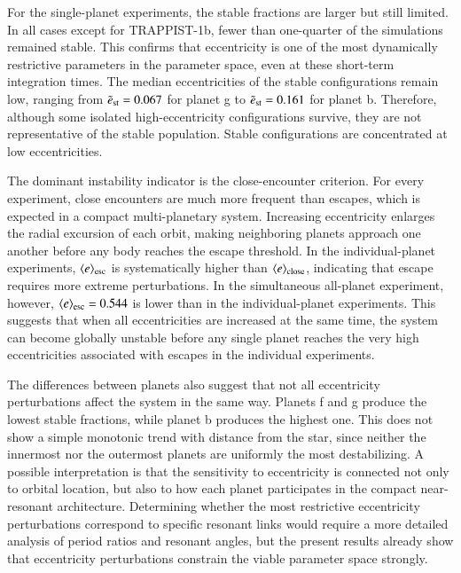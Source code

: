 \documentclass{aa}
\begin{document}
For the single-planet experiments, the stable fractions are larger but still limited. In all cases except for TRAPPIST-1b, fewer than one-quarter of the simulations remained stable. This confirms that eccentricity is one of the most dynamically restrictive parameters in the parameter space, even at these short-term integration times. The median eccentricities of the stable configurations remain low, ranging from $\tilde{e}_{\rm st}=0.067$ for planet g to $\tilde{e}_{\rm st}=0.161$ for planet b. Therefore, although some isolated high-eccentricity configurations survive, they are not representative of the stable population. Stable configurations are concentrated at low eccentricities.

The dominant instability indicator is the close-encounter criterion. For every experiment, close encounters are much more frequent than escapes, which is expected in a compact multi-planetary system. Increasing eccentricity enlarges the radial excursion of each orbit, making neighboring planets approach one another before any body reaches the escape threshold. In the individual-planet experiments, $\langle e\rangle_{\rm esc}$ is systematically higher than $\langle e\rangle_{\rm close}$, indicating that escape requires more extreme perturbations. In the simultaneous all-planet experiment, however, $\langle e\rangle_{\rm esc}=0.544$ is lower than in the individual-planet experiments. This suggests that when all eccentricities are increased at the same time, the system can become globally unstable before any single planet reaches the very high eccentricities associated with escapes in the individual experiments.

The differences between planets also suggest that not all eccentricity perturbations affect the system in the same way. Planets f and g produce the lowest stable fractions, while planet b produces the highest one. This does not show a simple monotonic trend with distance from the star, since neither the innermost nor the outermost planets are uniformly the most destabilizing. A possible interpretation is that the sensitivity to eccentricity is connected not only to orbital location, but also to how each planet participates in the compact near-resonant architecture. Determining whether the most restrictive eccentricity perturbations correspond to specific resonant links would require a more detailed analysis of period ratios and resonant angles, but the present results already show that eccentricity perturbations constrain the viable parameter space strongly.
\end{document}
